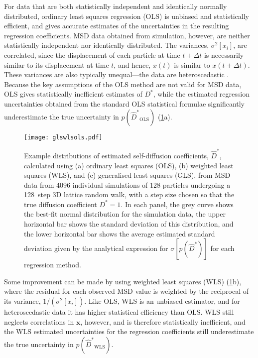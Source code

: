\documentclass[reprint,superscriptaddress,nobibnotes,amsmath,amssymb,aps,prx,hidelinks]{revtex4-2}
\newcommand{\oMSD}{\ensuremath{\bm{x}}}
\newcommand{\oMSDs}[1]{\ensuremath{x}(#1)}
\newcommand{\oMSDi}{\ensuremath{x_i}}
\newcommand{\prob}[1]{\ensuremath{p(#1)}}
\newcommand{\Dest}{\ensuremath{\widehat{D}^*}}
\newcommand{\D}{\ensuremath{D^*}}
\newcommand{\var}[1]{\ensuremath{\sigma^2[#1]}}
\begin{document}
For data that are both statistically independent and identically normally distributed, ordinary least squares regression (OLS) is unbiased and statistically efficient, and gives accurate estimates of the uncertainties in the resulting regression coefficients.
MSD data obtained from simulation, however, are neither statistically independent nor identically distributed.
The variances, $\var{\oMSDi}$, are correlated, since the displacement of each particle at time $t+\Delta t$ is necessarily similar to its displacement at time $t$, and hence, $\oMSDs{t}$ is similar to $\oMSDs{t+\Delta t}$.
These variances are also typically unequal---the data are heteroscedastic \cite{smith_random_1996,he_statistical_2018,UslerEtAl_JComputChem2023}. 
Because the key assumptions of the OLS method are not valid for MSD data, OLS gives statistically inefficient estimates of $\D$, while the estimated regression uncertainties obtained from the standard OLS statistical formulae significantly underestimate the true uncertainty in $\prob{\Dest_\mathrm{OLS}}$ (\cref{fig:glswlsols}a).

\begin{figure}
    \centering
    \texttt{[image: glswlsols.pdf]}
    \caption{
        Example distributions of estimated self-diffusion coefficients, $\Dest$, calculated using (a) ordinary least squares (OLS), (b) weighted least squares (WLS), and (c) generalised least squares (GLS),
        from MSD data from \num{4096} individual simulations of \num{128} particles undergoing a \SI{128}{step} 3D lattice random walk, with a step size chosen so that the true diffusion coefficient $\D = 1$.
        In each panel, the grey curve shows the best-fit normal distribution for the simulation data, the upper horizontal bar shows the standard deviation of this distribution, and the lower horizontal bar shows the average estimated standard deviation given by the analytical expression for $\sigma[\prob{\Dest}]$ for each regression method.}
    \label{fig:glswlsols}
\end{figure}

Some improvement can be made by using weighted least squares (WLS) (\cref{fig:glswlsols}b), where the residual for each observed MSD value is weighted by the reciprocal of its variance, $1/(\var{\oMSDi})$.
Like OLS, WLS is an unbiased estimator, and for heteroscedastic data it has higher statistical efficiency than OLS.
WLS still neglects correlations in $\oMSD$, however, and is therefore statistically inefficient, and the WLS estimated uncertainties for the regression coefficients still underestimate the true uncertainty in $\prob{\Dest_\mathrm{WLS}}$.
\end{document}
